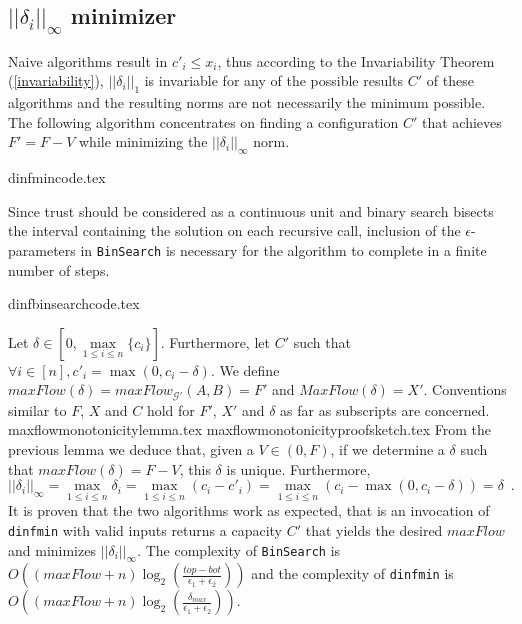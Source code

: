 \subsection{$||\delta_i||_{\infty}$ minimizer}
  Naive algorithms result in $c'_i \leq x_i$, thus according to the Invariability Theorem (\ref{invariability}),
  $||\delta_i||_1$ is invariable for any of the possible results $C'$ of these algorithms and the resulting norms are not
  necessarily the minimum possible. The following algorithm concentrates on finding a configuration $C'$ that achieves $F' = F
  - V$ while minimizing the $||\delta_i||_\infty$ norm.

  {dinfmincode.tex}

  Since trust should be considered as a continuous unit and binary search bisects the interval containing the solution
  on each recursive call, inclusion of the $\epsilon$-parameters in \texttt{BinSearch} is necessary for the algorithm to
  complete in a finite number of steps.

  {dinfbinsearchcode.tex}

  Let $\delta \in \left[0, \max\limits_{1 \leq i \leq n}{\{c_i\}}\right]$. Furthermore, let $C'$ such that $\forall i \in
  \left[n\right], c'_i = \max{\left(0, c_i - \delta\right)}$. We define $maxFlow\left(\delta\right) =
  maxFlow_{\mathcal{G}'}\left(A, B\right) = F'$ and $MaxFlow\left(\delta\right) = X'$. Conventions similar to $F$, $X$ and $C$
  hold for $F'$, $X'$ and $\delta$ as far as subscripts are concerned.
  {maxflowmonotonicitylemma.tex}
  {maxflowmonotonicityproofsketch.tex}
  From the previous lemma we deduce that, given a $V \in \left(0, F\right)$, if we determine a $\delta$ such that
  $maxFlow\left(\delta\right) = F - V$, this $\delta$ is unique. Furthermore,
  \begin{equation*}
    ||\delta_i||_\infty = \max\limits_{1 \leq i \leq n}{\delta_i} = \max\limits_{1 \leq i \leq n}{\left(c_i - c'_i\right)} =
    \max\limits_{1 \leq i \leq n}{\left(c_i - \max{\left(0, c_i - \delta\right)}\right)} = \delta \enspace.
  \end{equation*}
  It is proven that the two algorithms work as expected, that is an invocation of \texttt{dinfmin} with valid inputs returns a
  capacity $C'$ that yields the desired $maxFlow$ and minimizes $||\delta_i||_\infty$. The complexity of \texttt{BinSearch} is
  $O\left(\left(maxFlow + n\right)\log_2\left(\frac{top - bot}{\epsilon_1 + \epsilon_2}\right)\right)$ and the complexity of
  \texttt{dinfmin} is $O\left(\left(maxFlow + n\right)\log_2\left(\frac{\delta_{max}}{\epsilon_1 + \epsilon_2}\right)\right)$.

